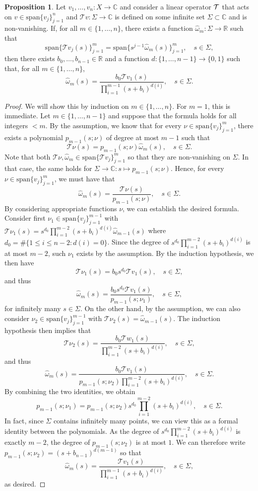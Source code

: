 \documentclass[a4paper,12pt,oneside]{article}
\theoremstyle{definition}
\newtheorem{prop}[defi]{Proposition}
\newcommand{\C}{\mathbb{C}}
\newcommand{\R}{\mathbb{R}}
\newcommand{\om}{\omega}
\newcommand{\spn}[1]{\text{span}\{#1\}}
\newcommand{\T}[1]{\mathcal{T}#1}
\begin{document}
\begin{prop} \label{DT_ALG_FUN}
    Let $v_1,\dots,v_n:X\to\C$ and consider a linear operator $\T$ that acts on $v\in \spn{v_j}_{j=1}^n$ and $\T{v}:\Sigma\to\C$ is defined on some infinite set $\Sigma\subset\C$ and is non-vanishing. If, for all $m\in\{1,\dots,n\}$, there exists a function $\hat{\om}_m:\Sigma\to\R$ such that
        $$\spn{\T{v_j}(s)}_{j=1}^{m} = \spn{ s^{j-1} \hat{\om}_m(s)}_{j=1}^{m},\quad s\in\Sigma,$$
    then there exists $b_0,\dots,b_{n-1}\in\R$ and a function $d:\{1,\dots,n-1\}\to\{0,1\}$ such that, for all $m\in\{1,\dots,n\}$,
    $$ \hat{\om}_m(s) = \frac{b_0 \T{v_1}(s)}{\prod_{i=1}^{m-1} (s+b_i)^{d(i)}},\quad s\in\Sigma.$$
\end{prop}
\begin{proof}
    We will show this by induction on $m\in\{1,\dots,n\}$. For $m=1$, this is immediate. Let $m\in\{1,\dots,n-1\}$ and suppose that the formula holds for all integers $<m$. By the assumption, we know that for every $\nu\in \spn{v_j}_{j=1}^{m}$, there exists a polynomial $p_{m-1}(s;\nu)$ of degree at most $m-1$ such that
        $$ \T{\nu}(s) = p_{m-1}(s;\nu) \hat{\om}_{m}(s),\quad s\in\Sigma. $$
    Note that both $\T{\nu},\hat{\om}_{m}\in\spn{\T{v_j}}_{j=1}^{m}$ so that they are non-vanishing on $\Sigma$. In that case, the same holds for $\Sigma\to\C:s\mapsto p_{m-1}(s;\nu)$. Hence, for every $\nu\in \spn{v_j}_{j=1}^{m}$, we must have that
        $$ \hat{\om}_{m}(s) = \frac{\T{\nu}(s)}{p_{m-1}(s;\nu)},\quad s\in\Sigma. $$
    By considering appropriate functions $\nu$, we can establish the desired formula. Consider first $\nu_1\in \spn{v_j}_{j=1}^{m-1}$ with $ \T{\nu_1}(s) = s^{d_0} \prod_{i=1}^{m-2} (s+b_i)^{d(i)} \hat{\om}_{m-1}(s) $ where $d_0 = \#\{1\leq i\leq n-2 : d(i) = 0 \}$. Since the degree of $s^{d_0} \prod_{i=1}^{m-2} (s+b_i)^{d(i)}$ is at most $m-2$, such $\nu_1$ exists by the assumption. By the induction hypothesis, we then have
        $$ \T{\nu_1}(s) = b_0 s^{d_0} \T{v_1}(s),\quad s\in\Sigma, $$
    and thus
        $$ \hat{\om}_{m}(s) = \frac{b_0 s^{d_0} \T{v_1}(s)}{p_{m-1}(s;\nu_1)},\quad s\in\Sigma, $$
    for infinitely many $s\in\Sigma$. On the other hand, by the assumption, we can also consider $\nu_2\in \spn{v_j}_{j=1}^{m-1}$ with $ \T{\nu_2}(s) = \hat{\om}_{m-1}(s) $. The induction hypothesis then implies that    
        $$ \T{\nu_2}(s) = \frac{b_0 \T{w_1}(s)}{\prod_{i=1}^{m-2}(s+b_i)^{d(i)}},\quad s\in\Sigma, $$
    and thus
        $$ \hat{\om}_{m}(s) = \frac{b_0 \T{v_1}(s)}{p_{m-1}(s;\nu_2) \prod_{i=1}^{m-2}(s+b_i)^{d(i)}},\quad s\in\Sigma. $$
    By combining the two identities, we obtain
        $$ p_{m-1}(s;\nu_1) = p_{m-1}(s;\nu_2) s^{d_0} \prod_{i=1}^{m-2}(s+b_i)^{d(i)},\quad s\in\Sigma.$$ 
    In fact, since $\Sigma$ contains infinitely many points, we can view this as a formal identity between the polynomials. As the degree of $s^{d_0} \prod_{i=1}^{m-2}(s+b_i)^{d(i)}$ is exactly $m-2$, the degree of $p_{m-1}(s;\nu_2)$ is at most $1$. We can therefore write $p_{m-1}(s;\nu_2)=(s+b_{n-1})^{d(m-1)}$ so that
        $$ \hat{\om}_{m}(s) = \frac{\T{v_1}(s)}{\prod_{i=1}^{m-1}(s+b_i)^{d(i)}}, \quad s\in\Sigma, $$
    as desired.
\end{proof}
\end{document}
